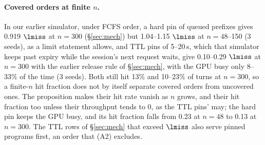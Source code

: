 \paragraph{Covered orders at finite $n$.} In our earlier simulator, under FCFS order, a hard pin of queued prefixes gives 0.919 $\lmiss$ at $n=300$ (\S\ref{sec:mech}) but 1.04--1.15 $\lmiss$ at $n=48$--150 (3 seeds), as a limit statement allows, and TTL pins of 5--20\,s, which that simulator keeps past expiry while the session's next request waits, give 0.10--0.29 $\lmiss$ at $n=300$ with the earlier release rule of \S\ref{sec:mech}, with the GPU busy only 8--33\% of the time (3 seeds). Both still hit 13\% and 10--23\% of turns at $n=300$, so a finite-$n$ hit fraction does not by itself separate covered orders from uncovered ones. The proposition makes their hit rate vanish as $n$ grows, and their hit fraction too unless their throughput tends to 0, as the TTL pins' may; the hard pin keeps the GPU busy, and its hit fraction falls from 0.23 at $n=48$ to 0.13 at $n=300$. The TTL rows of \S\ref{sec:mech} that exceed $\lmiss$ also serve pinned programs first, an order that (A2) excludes.

